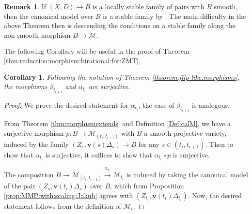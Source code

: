 \documentclass[11pt]{amsart}
\newtheorem{cor}[theorem]{Corollary}
\theoremstyle{definition}
\newtheorem{remark}[theorem]{Remark}
\theoremstyle{remark}
\newcommand{\sM}{\mathscr{M}}
\begin{document}
	\begin{remark} If $(X,D) \to B$ is a locally stable family of pairs with $B$ smooth, then the canonical model over $B$ is a stable family by \cite[Corollary 4.57]{kollarmodulibook}. The main difficulty in the above Theorem then is descending the conditions on a stable family along the non-smooth morphism $B \to \sM$.
	\end{remark} 
	
	The following Corollary will be useful in the proof of Theorem \ref{thm:reduction:morphism:birational:for:ZMT}.
	\begin{cor}
		\label{cor:reduction:morphisms:are:onto}
		Following the notation of Theorem \ref{theorem:flip-like:morphisms}, the morphisms $\beta_{t_{i+1}}$ and $\alpha_{t_{i}}$ are surjective.
	\end{cor}
	\begin{proof}We prove the desired statement for $\alpha_{t_i}$, the case of $\beta_{t_{i+1}}$ is analogous. 
		
		From Theorem \ref{thm:morphismextends} and Definition \ref{Def:calM}, we have a surjective morphism $p:B \to \sM_{(t_i, t_{i+1})}$ with $B$ a smooth projective variety,
		induced by the family $(Z_{s},\mathbf{v}(s)\Delta_{s})\to B$ for any $s \in (t_i, t_{i + 1})$. Then to show that $\alpha_{t_i}$ is surjective, it suffices to show that $\alpha_{t_i} \circ p$ is surjective.
		
		The composition $B \to \sM_{(t_i, t_{i+1})} \xrightarrow{\alpha_{t_i}} \sM_{t_i}$ is induced
		by taking the canonical model of the pair $(Z_{s},\mathbf{v}(t_i)\Delta_{s})$ over $B$, which from Proposition \ref{prop:MMP:with:scaling:Jakub} agrees with $(Z_{t_i},\mathbf{v}(t_i)\Delta_{t_i})$. Now, the desired statement follows from the definition of $\sM_{t}$.
	\end{proof}
	
\end{document}
